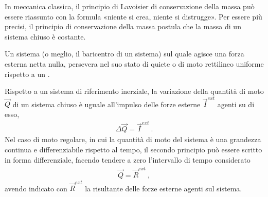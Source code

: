 \documentclass[letterpaper,10pt,italian]{jupyterBook}
\begin{document}
\sphinxAtStartPar
{} In meccanica classica, il principio di Lavoisier di conservazione della massa può essere riassunto con la formula «niente si crea, niente si distrugge». Per essere più precisi, il principio di conservazione della massa postula che la massa di un sistema chiuso è costante.

\sphinxAtStartPar
{} Un sistema (o meglio, il baricentro di un sistema) sul quale agisce una forza esterna netta nulla, persevera nel suo stato di quiete o di moto rettilineo uniforme rispetto a un {\hyperref[\detokenize{ch/mechanics/dynamics-principles:physics-hs-mechanics-dynamics-principles-inertial-ref-frame}]{}}.

\sphinxAtStartPar
{} Rispetto a un sistema di riferimento inerziale, la variazione della quantità di moto \(\vec{Q}\) di un sistema chiuso è uguale all’impulso delle forze esterne \(\vec{I}^{ext}\) agenti su di esso,
\begin{equation*}
\begin{split}\Delta \vec{Q} = \vec{I}^{ext} \ .\end{split}
\end{equation*}
\sphinxAtStartPar
Nel caso di moto regolare, in cui la quantità di moto del sistema è una grandezza continua e differenziabile rispetto al tempo, il secondo principio può essere scritto in forma differenziale, facendo tendere a zero l’intervallo di tempo considerato
\begin{equation*}
\begin{split}\dot{\vec{Q}} = \vec{R}^{ext} \ ,\end{split}
\end{equation*}
\sphinxAtStartPar
avendo indicato con \(\vec{R}^{ext}\) la risultante delle forze esterne agenti sul sistema.
\end{document}
